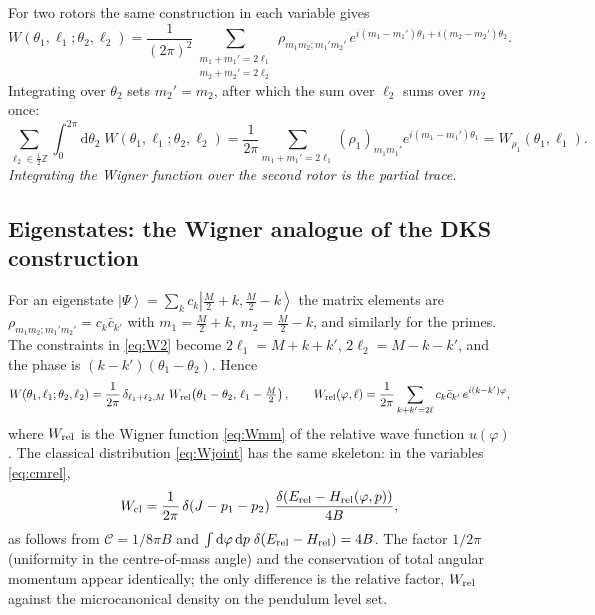 \documentclass[preprint,12pt]{elsarticle}
\newcommand{\ket}[1]{\left|#1\right\rangle}
\newcommand{\dd}{\mathrm{d}}
\newcommand{\Erel}{E_{\rm rel}}
\begin{document}
For two rotors the same construction in each variable gives
\begin{equation}
W(\theta_{1},\ell_{1};\theta_{2},\ell_{2})=\frac{1}{(2\pi)^{2}}
\sum_{\substack{m_{1}+m_{1}'=2\ell_{1}\\ m_{2}+m_{2}'=2\ell_{2}}}
\rho_{m_{1}m_{2};m_{1}'m_{2}'}\,
e^{i(m_{1}-m_{1}')\theta_{1}+i(m_{2}-m_{2}')\theta_{2}} .
\label{eq:W2}
\end{equation}
Integrating over $\theta_{2}$ sets $m_{2}'=m_{2}$, after which the sum over
$\ell_{2}$ sums over $m_{2}$ once:
\begin{equation}
\sum_{\ell_{2}\in\frac12\mathbb{Z}}\int_{0}^{2\pi}\dd\theta_{2}\;
W(\theta_{1},\ell_{1};\theta_{2},\ell_{2})
=\frac{1}{2\pi}\sum_{m_{1}+m_{1}'=2\ell_{1}}(\rho_{1})_{m_{1}m_{1}'}
e^{i(m_{1}-m_{1}')\theta_{1}}=W_{\rho_{1}}(\theta_{1},\ell_{1}).
\label{eq:Wmarg}
\end{equation}
\emph{Integrating the Wigner function over the second rotor is the partial
trace.}

\subsection{Eigenstates: the Wigner analogue of the DKS construction}

For an eigenstate $\ket\Psi=\sum_{k}c_{k}\ket{\tfrac M2+k,\tfrac M2-k}$ the
matrix elements are $\rho_{m_{1}m_{2};m_{1}'m_{2}'}=c_{k}\bar c_{k'}$ with
$m_{1}=\tfrac M2+k$, $m_{2}=\tfrac M2-k$, and similarly for the primes. The
constraints in \eqref{eq:W2} become $2\ell_{1}=M+k+k'$, $2\ell_{2}=M-k-k'$, and
the phase is $(k-k')(\theta_{1}-\theta_{2})$. Hence
\begin{equation}
W(\theta_{1},\ell_{1};\theta_{2},\ell_{2})=\frac{1}{2\pi}\,
\delta_{\ell_{1}+\ell_{2},M}\;W_{\rm rel}\!\left(\theta_{1}-\theta_{2},\,
\ell_{1}-\tfrac M2\right),\qquad
W_{\rm rel}(\varphi,\ell)=\frac{1}{2\pi}\sum_{k+k'=2\ell}c_{k}\bar c_{k'}\,
e^{i(k-k')\varphi},
\label{eq:Wfactor}
\end{equation}
where $W_{\rm rel}$ is the Wigner function \eqref{eq:Wmm} of the relative wave
function $u(\varphi)$. The classical distribution \eqref{eq:Wjoint} has the same
skeleton: in the variables \eqref{eq:cmrel},
\begin{equation}
W_{\rm cl}=\frac{1}{2\pi}\,\delta\!\left(J-p_{1}-p_{2}\right)\,
\frac{\delta\!\left(\Erel-H_{\rm rel}(\varphi,p)\right)}{4B},
\label{eq:Wclfactor}
\end{equation}
as follows from $\mathcal{C}=1/8\pi B$ and
$\int\dd\varphi\,\dd p\;\delta(\Erel-H_{\rm rel})=4B$. The factor $1/2\pi$
(uniformity in the centre-of-mass angle) and the conservation of total angular
momentum appear identically; the only difference is the relative factor,
$W_{\rm rel}$ against the microcanonical density on the pendulum level set.
\end{document}
